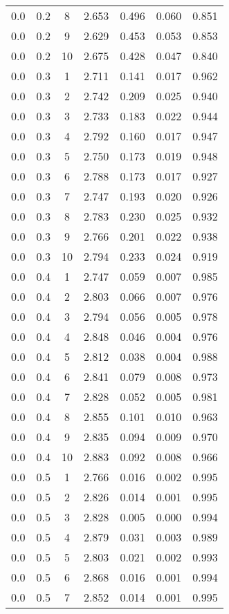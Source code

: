 \begin{tabular}{|c|c|c|c|c|c|c|}
0.0 & 0.2 & 8 & 2.653 & 0.496 & 0.060 & 0.851 \\
0.0 & 0.2 & 9 & 2.629 & 0.453 & 0.053 & 0.853 \\
0.0 & 0.2 & 10 & 2.675 & 0.428 & 0.047 & 0.840 \\
0.0 & 0.3 & 1 & 2.711 & 0.141 & 0.017 & 0.962 \\
0.0 & 0.3 & 2 & 2.742 & 0.209 & 0.025 & 0.940 \\
0.0 & 0.3 & 3 & 2.733 & 0.183 & 0.022 & 0.944 \\
0.0 & 0.3 & 4 & 2.792 & 0.160 & 0.017 & 0.947 \\
0.0 & 0.3 & 5 & 2.750 & 0.173 & 0.019 & 0.948 \\
0.0 & 0.3 & 6 & 2.788 & 0.173 & 0.017 & 0.927 \\
0.0 & 0.3 & 7 & 2.747 & 0.193 & 0.020 & 0.926 \\
0.0 & 0.3 & 8 & 2.783 & 0.230 & 0.025 & 0.932 \\
0.0 & 0.3 & 9 & 2.766 & 0.201 & 0.022 & 0.938 \\
0.0 & 0.3 & 10 & 2.794 & 0.233 & 0.024 & 0.919 \\
0.0 & 0.4 & 1 & 2.747 & 0.059 & 0.007 & 0.985 \\
0.0 & 0.4 & 2 & 2.803 & 0.066 & 0.007 & 0.976 \\
0.0 & 0.4 & 3 & 2.794 & 0.056 & 0.005 & 0.978 \\
0.0 & 0.4 & 4 & 2.848 & 0.046 & 0.004 & 0.976 \\
0.0 & 0.4 & 5 & 2.812 & 0.038 & 0.004 & 0.988 \\
0.0 & 0.4 & 6 & 2.841 & 0.079 & 0.008 & 0.973 \\
0.0 & 0.4 & 7 & 2.828 & 0.052 & 0.005 & 0.981 \\
0.0 & 0.4 & 8 & 2.855 & 0.101 & 0.010 & 0.963 \\
0.0 & 0.4 & 9 & 2.835 & 0.094 & 0.009 & 0.970 \\
0.0 & 0.4 & 10 & 2.883 & 0.092 & 0.008 & 0.966 \\
0.0 & 0.5 & 1 & 2.766 & 0.016 & 0.002 & 0.995 \\
0.0 & 0.5 & 2 & 2.826 & 0.014 & 0.001 & 0.995 \\
0.0 & 0.5 & 3 & 2.828 & 0.005 & 0.000 & 0.994 \\
0.0 & 0.5 & 4 & 2.879 & 0.031 & 0.003 & 0.989 \\
0.0 & 0.5 & 5 & 2.803 & 0.021 & 0.002 & 0.993 \\
0.0 & 0.5 & 6 & 2.868 & 0.016 & 0.001 & 0.994 \\
0.0 & 0.5 & 7 & 2.852 & 0.014 & 0.001 & 0.995 \\

\end{tabular}
